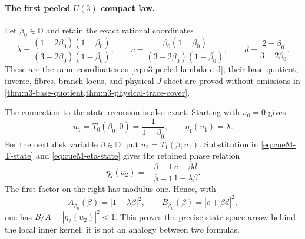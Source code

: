 \paragraph{The first peeled $U(3)$ compact law.}
Let $\beta_0\in\mathbb D$ and retain the exact rational coordinates
\begin{equation}
 \lambda=
 \frac{(1-2\overline{\beta_0})(1-\beta_0)}
 {(3-2\beta_0)(1-\overline{\beta_0})},\qquad
 c=\frac{\overline{\beta_0}(1-\beta_0)}
 {(3-2\beta_0)(1-\overline{\beta_0})},\qquad
 d=\frac{2-\beta_0}{3-2\beta_0}.
 \label{eq:cueM-U3-lambda-c-d}
\end{equation}
These are the same coordinates as \eqref{eq:n3-peeled-lambda-c-d}; their base quotient,
inverse, fibres, branch locus, and physical $J$-sheet are proved without omissions in
\cref{thm:n3-base-quotient,thm:n3-physical-trace-cover}.

The connection to the state recursion is also exact.  Starting with $u_0=0$ gives
\begin{equation}
 u_1=T_0(\beta_0;0)=\frac1{1-\beta_0},\qquad
 \eta_1(u_1)=\lambda.
 \label{eq:cueM-U3-first-state}
\end{equation}
For the next disk variable $\beta\in\mathbb D$, put
$u_2=T_1(\beta;u_1)$.  Substitution in \eqref{eq:cueM-T-state} and
\eqref{eq:cueM-eta-state} gives the retained phase relation
\begin{equation}
 \eta_2(u_2)=
 -\frac{\beta-1}{\overline\beta-1}
 \frac{c+\overline\beta d}{1-\lambda\beta}.
 \label{eq:cueM-U3-second-state}
\end{equation}
The first factor on the right has modulus one.  Hence, with
\begin{equation}
 A_{\beta_0}(\beta)=|1-\lambda\beta|^2,\qquad
 B_{\beta_0}(\beta)=|c+\overline\beta d|^2,
 \label{eq:cueM-U3-A-B}
\end{equation}
one has $B/A=|\eta_2(u_2)|^2<1$.  This proves the precise state-space arrow behind the local
inner kernel; it is not an analogy between two formulas.

